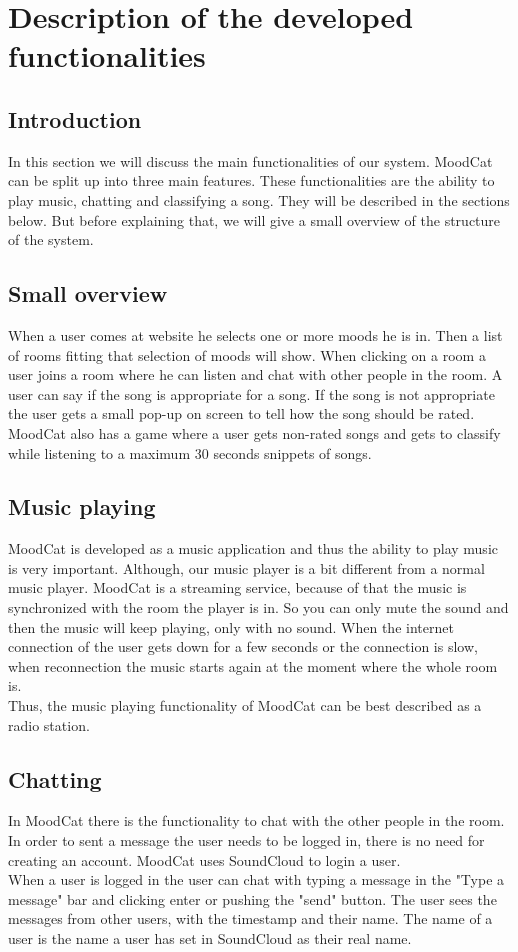 \chapter{Description of the developed functionalities}

\section{Introduction}
In this section we will discuss the main functionalities of our system.
MoodCat can be split up into three main features.
These functionalities are the ability to play music, chatting and classifying a song.
They will be described in the sections below.
But before explaining that, we will give a small overview of the structure of the system.

\section{Small overview}
When a user comes at website he selects one or more moods he is in. 
Then a list of rooms fitting that selection of moods will show.
When clicking on a room a user joins a room where he can listen and chat with other people in the room.
A user can say if the song is appropriate for a song. If the song is not appropriate the user gets a small pop-up on screen to tell how the song should be rated.
\\
MoodCat also has a game where a user gets non-rated songs and gets to classify while listening to a maximum 30 seconds snippets of songs.


\section{Music playing}
MoodCat is developed as a music application and thus the ability to play music is very important.
Although, our music player is a bit different from a normal music player.
MoodCat is a streaming service, because of that the music is synchronized with the room the player is in.  
So you can only mute the sound and then the music will keep playing, only with no sound.
When the internet connection of the user gets down for a few seconds or the connection is slow, when reconnection the music starts again at the moment where the whole room is.\\
Thus, the music playing functionality of MoodCat can be best described as a radio station.

\section{Chatting}
In MoodCat there is the functionality to chat with the other people in the room.
In order to sent a message the user needs to be logged in, there is no need for creating an account.
MoodCat uses SoundCloud to login a user.\\
When a user is logged in the user can chat with typing a message in the "Type a message" bar and clicking enter or pushing the "send" button.
The user sees the messages from other users, with the timestamp and their name.
The name of a user is the name a user has set in SoundCloud as their real name.

